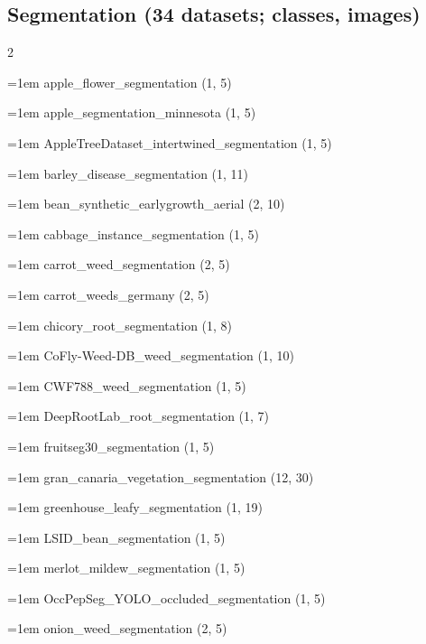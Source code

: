 \subsection*{Segmentation (34 datasets; classes, images)}
\begin{multicols}{2}\raggedright
\hangindent=1em apple\_\allowbreak{}flower\_\allowbreak{}segmentation (1, 5)\par
\hangindent=1em apple\_\allowbreak{}segmentation\_\allowbreak{}minnesota (1, 5)\par
\hangindent=1em AppleTreeDataset\_\allowbreak{}intertwined\_\allowbreak{}segmentation (1, 5)\par
\hangindent=1em barley\_\allowbreak{}disease\_\allowbreak{}segmentation (1, 11)\par
\hangindent=1em bean\_\allowbreak{}synthetic\_\allowbreak{}earlygrowth\_\allowbreak{}aerial (2, 10)\par
\hangindent=1em cabbage\_\allowbreak{}instance\_\allowbreak{}segmentation (1, 5)\par
\hangindent=1em carrot\_\allowbreak{}weed\_\allowbreak{}segmentation (2, 5)\par
\hangindent=1em carrot\_\allowbreak{}weeds\_\allowbreak{}germany (2, 5)\par
\hangindent=1em chicory\_\allowbreak{}root\_\allowbreak{}segmentation (1, 8)\par
\hangindent=1em CoFly-Weed-DB\_\allowbreak{}weed\_\allowbreak{}segmentation (1, 10)\par
\hangindent=1em CWF788\_\allowbreak{}weed\_\allowbreak{}segmentation (1, 5)\par
\hangindent=1em DeepRootLab\_\allowbreak{}root\_\allowbreak{}segmentation (1, 7)\par
\hangindent=1em fruitseg30\_\allowbreak{}segmentation (1, 5)\par
\hangindent=1em gran\_\allowbreak{}canaria\_\allowbreak{}vegetation\_\allowbreak{}segmentation (12, 30)\par
\hangindent=1em greenhouse\_\allowbreak{}leafy\_\allowbreak{}segmentation (1, 19)\par
\hangindent=1em LSID\_\allowbreak{}bean\_\allowbreak{}segmentation (1, 5)\par
\hangindent=1em merlot\_\allowbreak{}mildew\_\allowbreak{}segmentation (1, 5)\par
\hangindent=1em OccPepSeg\_\allowbreak{}YOLO\_\allowbreak{}occluded\_\allowbreak{}segmentation (1, 5)\par
\hangindent=1em onion\_\allowbreak{}weed\_\allowbreak{}segmentation (2, 5)\par

\end{multicols}
